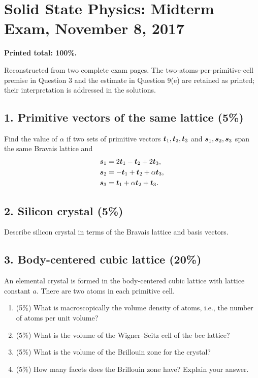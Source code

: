 \chapter{Solid State Physics: Midterm Exam, November 8, 2017}
\label{q:physics-2017-11-midterm}
\textbf{Printed total: 100\%.}
\begin{sourceNote}
Reconstructed from two complete exam pages. The two-atoms-per-primitive-cell premise in Question 3 and the estimate in Question 9(e) are retained as printed; their interpretation is addressed in the solutions.
\end{sourceNote}

\section*{1. Primitive vectors of the same lattice (5\%)}
Find the value of $\alpha$ if two sets of primitive vectors
$\boldsymbol{t}_1,\boldsymbol{t}_2,\boldsymbol{t}_3$ and $\boldsymbol{s}_1,\boldsymbol{s}_2,\boldsymbol{s}_3$ span the same Bravais lattice and
\begin{align*}
\boldsymbol{s}_1&=2\boldsymbol{t}_1-\boldsymbol{t}_2+2\boldsymbol{t}_3,\\
\boldsymbol{s}_2&=-\boldsymbol{t}_1+\boldsymbol{t}_2+\alpha\boldsymbol{t}_3,\\
\boldsymbol{s}_3&=\boldsymbol{t}_1+\alpha\boldsymbol{t}_2+\boldsymbol{t}_3.
\end{align*}

\section*{2. Silicon crystal (5\%)}
Describe silicon crystal in terms of the Bravais lattice and basis vectors.

\section*{3. Body-centered cubic lattice (20\%)}
An elemental crystal is formed in the body-centered cubic lattice with lattice constant $a$. There are two atoms in each primitive cell.
\begin{enumerate}[label=(\alph*)]
\item (5\%) What is macroscopically the volume density of atoms, i.e., the number of atoms per unit volume?
\item (5\%) What is the volume of the Wigner--Seitz cell of the bcc lattice?
\item (5\%) What is the volume of the Brillouin zone for the crystal?
\item (5\%) How many facets does the Brillouin zone have? Explain your answer.
\end{enumerate}

